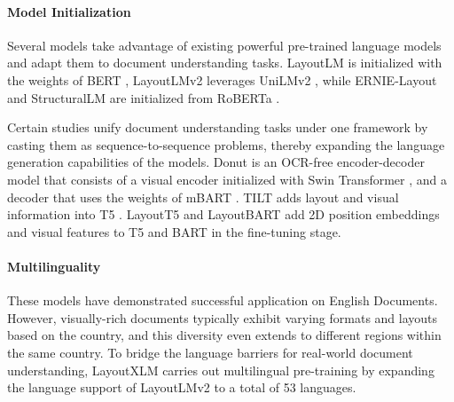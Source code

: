
\paragraph{Model Initialization} 

Several models take advantage of existing powerful pre-trained language models and adapt them to document understanding tasks. LayoutLM \citep{xu2020layoutlm} is initialized with the weights of \ac{BERT} \citep{devlin2018bert}, LayoutLMv2 \citep{xu2020layoutlmv2} leverages UniLMv2 \citep{bao2020unilmv2}, while ERNIE-Layout \citep{peng2022ernie} and StructuralLM \citep{li2021structurallm} are initialized from RoBERTa \citep{liu2019roberta}.

Certain studies unify document understanding tasks under one framework by casting them as sequence-to-sequence problems, thereby expanding the language generation capabilities of the models. Donut \citep{kim2022ocr} is an OCR-free encoder-decoder model that consists of a visual encoder initialized with Swin Transformer \citep{liu2021swin}, and a decoder that uses the weights of mBART \citep{liu2020multilingual}. TILT \citep{powalski2021going} adds layout and visual information into \ac{T5} \citep{raffel2020exploring}. LayoutT5 and LayoutBART \citep{tanaka2021visualmrc} add 2D position embeddings and visual features to \ac{T5} and \ac{BART} \citep{lewis2019bart} in the fine-tuning stage.

\paragraph{Multilinguality} 

These models have demonstrated successful application on English Documents. However, visually-rich documents typically exhibit varying formats and layouts based on the country, and this diversity even extends to different regions within the same country. To bridge the language barriers for real-world document understanding, LayoutXLM \citep{xu2021layoutxlm} carries out multilingual pre-training by expanding the language support of LayoutLMv2 to a total of 53 languages.

